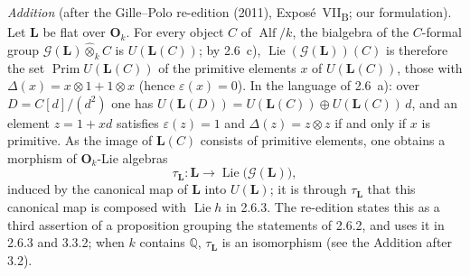 \par\medskip\noindent{}%
\emph{Addition} (after the Gille--Polo re-edition (2011),
Expos\'e~VII\textsubscript{B}; our formulation). Let \(\mathbf L\) be flat over
\(\mathbf O_k\). For every object \(C\) of \(\operatorname{Alf}/k\), the
bialgebra of the \(C\)-formal group \(\mathscr G(\mathbf L)\widehat\otimes_kC\)
is \(U(\mathbf L(C))\); by 2.6~c), \(\operatorname{Lie}(\mathscr G(\mathbf L))(C)\)
is therefore the set \(\operatorname{Prim}U(\mathbf L(C))\) of the primitive
elements \(x\) of \(U(\mathbf L(C))\), those with
\(\Delta(x)=x\otimes1+1\otimes x\) \textup{(}hence \(\varepsilon(x)=0\)\textup{)}. In the
language of 2.6~a): over \(D=C[d]/(d^2)\) one has
\(U(\mathbf L(D))=U(\mathbf L(C))\oplus U(\mathbf L(C))\,d\), and an element
\(z=1+xd\) satisfies \(\varepsilon(z)=1\) and \(\Delta(z)=z\otimes z\) if and
only if \(x\) is primitive. As the image of \(\mathbf L(C)\) consists of
primitive elements, one obtains a morphism of \(\mathbf O_k\)-Lie algebras
\[
  \tau_{\mathbf L}:\mathbf L\longrightarrow
  \operatorname{Lie}\bigl(\mathscr G(\mathbf L)\bigr),
\]
induced by the canonical map of \(\mathbf L\) into \(U(\mathbf L)\); it is
through \(\tau_{\mathbf L}\) that this canonical map is composed with
\(\operatorname{Lie}h\) in 2.6.3. The re-edition states this as a third
assertion of a proposition grouping the statements of 2.6.2, and uses it
in 2.6.3 and 3.3.2; when \(k\) contains \(\mathbb Q\), \(\tau_{\mathbf L}\)
is an isomorphism (see the Addition after 3.2).
